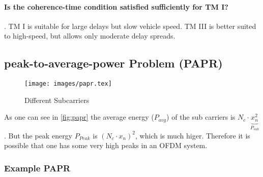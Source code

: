 \paragraph{Is the coherence-time condition satisfied sufficiently for TM I?}.
TM I is suitable for large delays but slow vehicle speed. TM III is better suited to high-speed, but allows
only moderate delay spreads.
\subsection{peak-to-average-power Problem (PAPR)} 
\begin{figure}[ht]
    \centering
    \texttt{[image: images/papr.tex]}
    \caption{Different Subcarriers}
    \label{fig:papr}
\end{figure}
As one can see in \autoref{fig:papr} the average energy ($P_{avg}$) of the sub carriers is $N_c \cdot \underbrace{x_n^2}_{P_{sub}}$. But the peak energy $P_{Peak}$ is $(N_c \cdot x_n)^2$, which is much higer. Therefore it is possible that one has some very high peaks in an OFDM system.
\subsubsection{Example PAPR}
